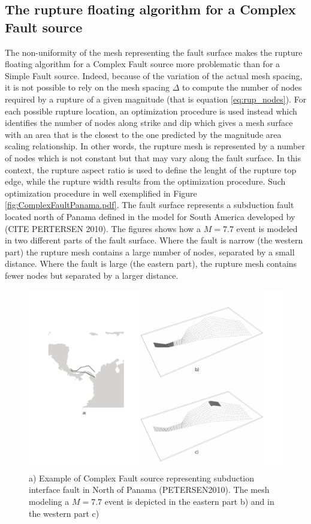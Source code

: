 \subsection{The rupture floating algorithm for a Complex Fault source}
The non-uniformity of the mesh representing the fault surface makes the rupture floating algorithm for a Complex
Fault source more problematic than for a Simple Fault source. Indeed, because of the variation of the actual mesh spacing, it is not possible to rely on the mesh spacing $\Delta$ to compute the number of nodes required by a rupture of a given magnitude (that is equation \ref{eq:rup_nodes}). For each possible rupture location, an optimization
procedure is used instead which identifies the number of nodes along strike and dip which gives a mesh surface with an area that is the closest to the one predicted by the magnitude area scaling relationship. In other words, the rupture mesh is represented by a number of nodes which is not constant but that may vary along the fault surface. In this context, the rupture aspect ratio is used to define the lenght of the rupture top edge, while the rupture width results from the optimization procedure. Such optimization procedure in well exemplified in Figure \ref{fig:ComplexFaultPanama.pdf}. The fault surface represents a subduction fault located north of Panama defined
in the model for South America developed by (CITE PERTERSEN 2010). The figures shows how a $M=7.7$ event is modeled in two different parts of the fault surface. Where the fault is narrow (the western part) the rupture mesh
contains a large number of nodes, separated by a small distance. Where the fault is large (the eastern part), the
rupture mesh contains fewer nodes but separated by a larger distance.
\begin{figure}
\centering
\includegraphics[width=14cm]{./Pictures/ComplexFaultPanama.pdf}
\caption{a) Example of Complex Fault source representing subduction interface fault in North of Panama (PETERSEN2010). The mesh modeling a $M=7.7$ event is depicted in the eastern part b) and in the western part c)}
\label{fig:ComplexFaultSourcePanama}
\end{figure}

